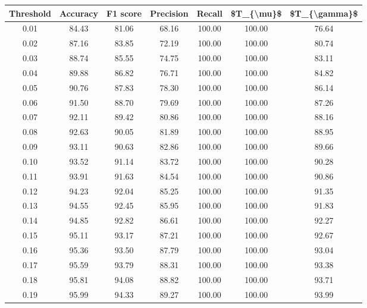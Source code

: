 \begin{tabular}{|c|c|c|c|c|c|c|}
\hline
 Threshold &  Accuracy &  F1 score &  Precision &  Recall &  \$T\_\{\textbackslash mu\}\$ &  \$T\_\{\textbackslash gamma\}\$ \\
\hline
      0.01 &     84.43 &     81.06 &      68.16 &  100.00 &     100.00 &         76.64 \\
      0.02 &     87.16 &     83.85 &      72.19 &  100.00 &     100.00 &         80.74 \\
      0.03 &     88.74 &     85.55 &      74.75 &  100.00 &     100.00 &         83.11 \\
      0.04 &     89.88 &     86.82 &      76.71 &  100.00 &     100.00 &         84.82 \\
      0.05 &     90.76 &     87.83 &      78.30 &  100.00 &     100.00 &         86.14 \\
      0.06 &     91.50 &     88.70 &      79.69 &  100.00 &     100.00 &         87.26 \\
      0.07 &     92.11 &     89.42 &      80.86 &  100.00 &     100.00 &         88.16 \\
      0.08 &     92.63 &     90.05 &      81.89 &  100.00 &     100.00 &         88.95 \\
      0.09 &     93.11 &     90.63 &      82.86 &  100.00 &     100.00 &         89.66 \\
      0.10 &     93.52 &     91.14 &      83.72 &  100.00 &     100.00 &         90.28 \\
      0.11 &     93.91 &     91.63 &      84.54 &  100.00 &     100.00 &         90.86 \\
      0.12 &     94.23 &     92.04 &      85.25 &  100.00 &     100.00 &         91.35 \\
      0.13 &     94.55 &     92.45 &      85.95 &  100.00 &     100.00 &         91.83 \\
      0.14 &     94.85 &     92.82 &      86.61 &  100.00 &     100.00 &         92.27 \\
      0.15 &     95.11 &     93.17 &      87.21 &  100.00 &     100.00 &         92.67 \\
      0.16 &     95.36 &     93.50 &      87.79 &  100.00 &     100.00 &         93.04 \\
      0.17 &     95.59 &     93.79 &      88.31 &  100.00 &     100.00 &         93.38 \\
      0.18 &     95.81 &     94.08 &      88.82 &  100.00 &     100.00 &         93.71 \\
      0.19 &     95.99 &     94.33 &      89.27 &  100.00 &     100.00 &         93.99 \\

\end{tabular}
